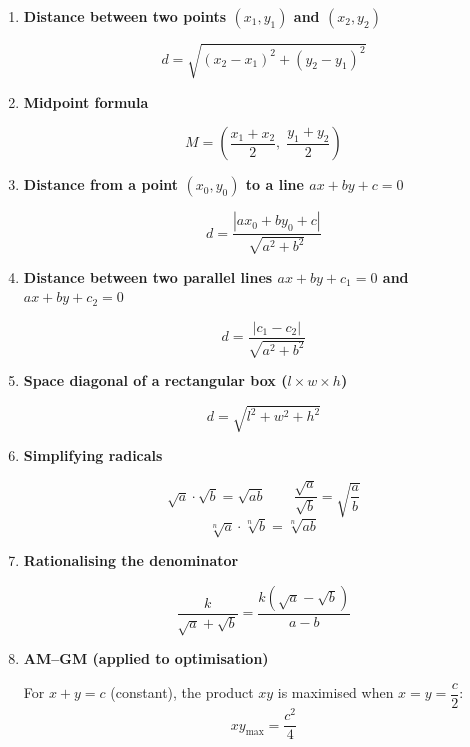 \documentclass[10pt,letterpaper]{article}
\begin{document}
\begin{enumerate}

\item \textbf{Distance between two points $(x_1,y_1)$ and $(x_2,y_2)$}

$$d = \sqrt{(x_2-x_1)^2 + (y_2-y_1)^2}$$

\item \textbf{Midpoint formula}

$$M = \left(\frac{x_1+x_2}{2},\; \frac{y_1+y_2}{2}\right)$$

\item \textbf{Distance from a point $(x_0,y_0)$ to a line $ax+by+c=0$}

$$d = \frac{|ax_0 + by_0 + c|}{\sqrt{a^2+b^2}}$$

\item \textbf{Distance between two parallel lines $ax+by+c_1=0$ and $ax+by+c_2=0$}

$$d = \frac{|c_1-c_2|}{\sqrt{a^2+b^2}}$$

\item \textbf{Space diagonal of a rectangular box ($l \times w \times h$)}

$$d = \sqrt{l^2 + w^2 + h^2}$$

\item \textbf{Simplifying radicals}

$$\sqrt{a} \cdot \sqrt{b} = \sqrt{ab} \qquad \frac{\sqrt{a}}{\sqrt{b}} = \sqrt{\frac{a}{b}}$$
$$\sqrt[n]{a} \cdot \sqrt[n]{b} = \sqrt[n]{ab}$$

\item \textbf{Rationalising the denominator}

$$\frac{k}{\sqrt{a}+\sqrt{b}} = \frac{k(\sqrt{a}-\sqrt{b})}{a-b}$$

\item \textbf{AM--GM (applied to optimisation)}

For $x + y = c$ (constant), the product $xy$ is maximised when $x = y = \dfrac{c}{2}$:
$$xy_{\max} = \frac{c^2}{4}$$

\end{enumerate}
\end{document}
